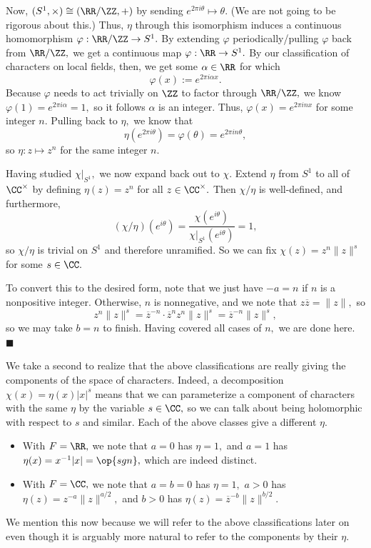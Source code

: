 Now, $(S^1,\times)\cong(\RR/\ZZ,+)$ by sending $e^{2\pi i\theta}\mapsto\theta.$ (We are not going to be rigorous about this.) Thus, $\eta$ through this isomorphism induces a continuous homomorphism $\varphi:\RR/\ZZ\to S^1.$ By extending $\varphi$ periodically/pulling $\varphi$ back from $\RR/\ZZ,$ we get a continuous map $\varphi:\RR\to S^1.$ By our classification of characters on local fields, then, we get some $\alpha\in\RR$ for which
\[\varphi(x):=e^{2\pi i\alpha x}.\]
Because $\varphi$ needs to act trivially on $\ZZ$ to factor through $\RR/\ZZ,$ we know $\varphi(1)=e^{2\pi i\alpha}=1,$ so it follows $\alpha$ is an integer. Thus, $\varphi(x)=e^{2\pi inx}$ for some integer $n.$ Pulling back to $\eta,$ we know that
\[\eta\left(e^{2\pi i\theta}\right)=\varphi(\theta)=e^{2\pi in\theta},\]
so $\eta:z\mapsto z^n$ for the same integer $n.$

Having studied $\chi|_{S^1},$ we now expand back out to $\chi.$ Extend $\eta$ from $S^1$ to all of $\CC^\times$ by defining $\eta(z)=z^n$ for all $z\in\CC^\times.$ Then $\chi/\eta$ is well-defined, and furthermore,
\[(\chi/\eta)\left(e^{i\theta}\right)=\frac{\chi\left(e^{i\theta}\right)}{\chi|_{S^1}\left(e^{i\theta}\right)}=1,\]
so $\chi/\eta$ is trivial on $S^1$ and therefore unramified. So we can fix $\chi(z)=z^n\lVert z\rVert^s$ for some $s\in\CC.$

To convert this to the desired form, note that we just have $-a=n$ if $n$ is a nonpositive integer. Otherwise, $n$ is nonnegative, and we note that $z\overline z=\lVert z\rVert,$ so
\[z^n\lVert z\rVert^s=\overline z^{-n}\cdot\overline z^nz^n\lVert z\rVert^s=\overline z^{-n}\lVert z\rVert^s,\]
so we may take $b=n$ to finish. Having covered all cases of $n,$ we are done here. $\blacksquare$

We take a second to realize that the above classifications are really giving the components of the space of characters. Indeed, a decomposition $\chi(x)=\eta(x)|x|^s$ means that we can parameterize a component of characters with the same $\eta$ by the variable $s\in\CC,$ so we can talk about being holomorphic with respect to $s$ and similar. Each of the above classes give a different $\eta.$
\begin{itemize}
    \item With $F=\RR,$ we note that $a=0$ has $\eta=1,$ and $a=1$ has $\eta(x)=x^{-1}|x|=\op{sgn},$ which are indeed distinct.
    \item With $F=\CC,$ we note that $a=b=0$ has $\eta=1,$ $a>0$ has $\eta(z)=z^{-a}\lVert z\rVert^{a/2},$ and $b>0$ has $\eta(z)=\overline z^{-b}\lVert z\rVert^{b/2}.$
\end{itemize}
We mention this now because we will refer to the above classifications later on even though it is arguably more natural to refer to the components by their $\eta.$

